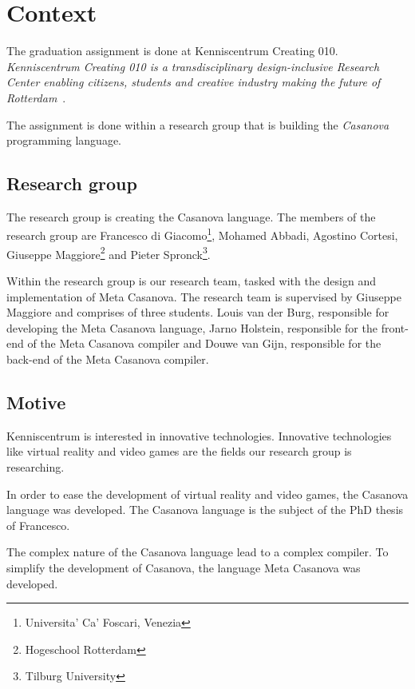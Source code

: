 \section{Context}\label{context}
The graduation assignment is done at Kenniscentrum Creating 010.
\textit{Kenniscentrum Creating 010 is a transdisciplinary design-inclusive Research Center enabling citizens, students and creative industry making the future of Rotterdam}~\cite{creating2016home}.

The assignment is done within a research group that is building the \textit{Casanova} programming language.

\subsection{Research group}
The research group is creating the Casanova language.
The members of the research group are 
  Francesco di Giacomo\footnote{\label{venice}Universita' Ca' Foscari, Venezia}, 
  Mohamed Abbadi, 
  Agostino Cortesi, 
  Giuseppe Maggiore\footnote{Hogeschool Rotterdam} and 
  Pieter Spronck\footnote{Tilburg University}.

Within the research group is our research team, tasked with the design and implementation of Meta Casanova.
The research team is supervised by Giuseppe Maggiore and comprises of three students.
Louis van der Burg, responsible for developing the Meta Casanova language,
Jarno Holstein, responsible for the front-end of the Meta Casanova compiler
and Douwe van Gijn, responsible for the back-end of the Meta Casanova compiler.

\subsection{Motive}\label{motive}
Kenniscentrum is interested in innovative technologies.
Innovative technologies like virtual reality and video games are the fields our research group is researching.

In order to ease the development of virtual reality and video games, the Casanova language was developed.
The Casanova language is the subject of the PhD thesis of Francesco.

The complex nature of the Casanova language lead to a complex compiler.
To simplify the development of Casanova, the language Meta Casanova was developed.

